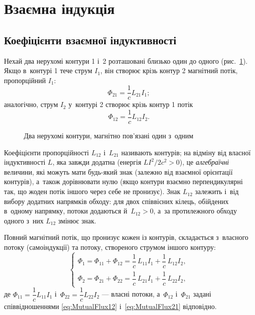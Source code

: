 \section{Взаємна індукція}\hypertarget{mutual-inductance}{}



\subsection*{Коефіцієнти взаємної індуктивності}



Нехай два нерухомі контури 1 і~2 розташовані близько один до одного
(рис.~\ref{pic:TwoContours}). Якщо в~контурі 1 тече струм $I_1$, він створює крізь контур
2 магнітний потік, пропорційний $I_1$:
\begin{equation}\label{eq:MutualFlux21}
	\Phi_{21} = \frac1c L_{21}I_1;
\end{equation}
аналогічно, струм $I_2$ у~контурі 2 створює крізь контур 1 потік
\begin{equation}\label{eq:MutualFlux12}
	\Phi_{12} = \frac1c L_{12}I_2.
\end{equation}

\begin{figure}\centering
	\caption{Два нерухомі контури, магнітно пов'язані один з~одним\label{pic:TwoContours}}
\end{figure}

Коефіцієнти пропорційності $L_{12}$ і~$L_{21}$ називають  контурів; на відміну від власної індуктивності $L$, яка завжди
додатна (енергія $LI^2/2c^2>0$), це \emph{алгебраїчні} величини, які можуть мати будь-який знак (залежно від
взаємної орієнтації контурів), а~також дорівнювати нулю (якщо контури взаємно
перпендикулярні так, що жоден потік іншого через себе не пронизує). Знак $L_{12}$ залежить і~від вибору додатних напрямків обходу: для двох співвісних кілець, обійдених в~одному напрямку, потоки додаються й~$L_{12}>0$, а~за протилежного обходу одного з~них $L_{12}$ змінює знак.

Повний магнітний потік, що пронизує кожен із контурів, складається з~власного потоку
(самоіндукції) та потоку, створеного струмом іншого контуру:
\begin{equation}\label{eq:MutualFluxes}
	\begin{cases}
		\Phi_1 = \Phi_{11} + \Phi_{12}
		= \dfrac1c\,L_{11}I_1 + \dfrac1c\,L_{12}I_2, \\[1.5ex]
		\Phi_2 = \Phi_{21} + \Phi_{22}
		= \dfrac1c\,L_{21}I_1 + \dfrac1c\,L_{22}I_2,
	\end{cases}
\end{equation}
де $\Phi_{11}=\dfrac1c L_{11}I_1$ і~$\Phi_{22}=\dfrac1c L_{22}I_2$ --- власні потоки,
а~$\Phi_{12}$ і~$\Phi_{21}$ задані співвідношеннями \eqref{eq:MutualFlux12}
і~\eqref{eq:MutualFlux21} відповідно.

